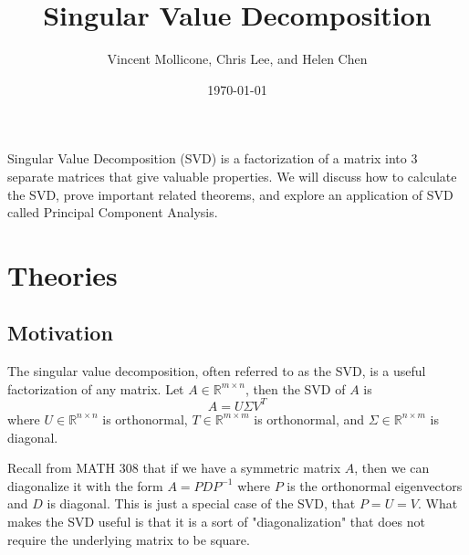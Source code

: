 \documentclass{article}
\title{Singular Value Decomposition}
\author{Vincent Mollicone, Chris Lee, and Helen Chen}
\date{\today}
\begin{document}
\maketitle
Singular Value Decomposition (SVD) is a factorization of a matrix into 3 separate matrices that give valuable properties. We will discuss how to calculate the SVD, prove important related theorems, and explore an application of SVD called Principal Component Analysis.
\tableofcontents
\newpage

\section{Theories}
\subsection{Motivation}
The singular value decomposition, often referred to as the SVD, is a useful factorization of any matrix. Let $A\in\mathbb{R}^{m\times n}$, then the SVD of $A$ is
$$A = U \Sigma V^T$$
where $U\in\mathbb{R}^{n\times n}$ is orthonormal, $T\in\mathbb{R}^{m\times m}$ is orthonormal, and $\Sigma\in\mathbb{R}^{n\times m}$ is diagonal.

Recall from MATH 308 that if we have a symmetric matrix $A$, then we can diagonalize it with the form $A=PDP^{-1}$ where $P$ is the orthonormal eigenvectors and $D$ is diagonal. This is just a special case of the SVD, that $P = U = V$. What makes the SVD useful is that it is a sort of "diagonalization" that does not require the underlying matrix to be square.
\end{document}
